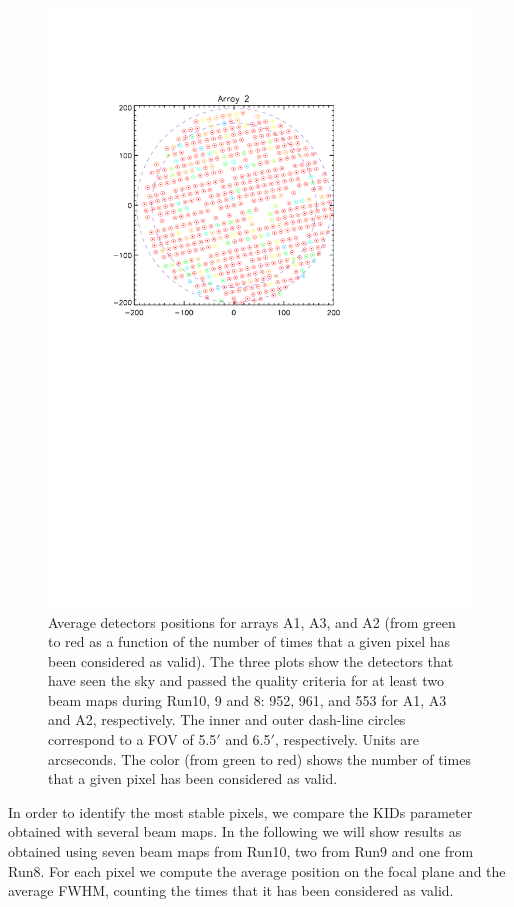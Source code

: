 \begin{figure}[htp]
\begin{center}
\includegraphics[trim=2cm 14cm 5cm 4cm, clip=true,width=0.6\linewidth]{Figures/A2_fwhm_color_count.pdf}
\caption{Average detectors positions for arrays A1, A3, and A2 (from
  green to red as a function of the number of times that a given pixel
  has been considered as valid). The three plots show the detectors
  that have seen the sky and passed the quality criteria for at least
  two beam maps during Run10, 9 and 8: 952, 961, and 553
  for A1, A3 and A2, respectively. The inner and outer dash-line circles correspond to a FOV of 5.5$\prime$ and 6.5$\prime$, respectively. Units are arcseconds. The color (from green to red)  shows the number of times that a given pixel has been considered as valid.}
\label{fig:avg_fov_color}
\end{center}
\end{figure}

In order to identify the most stable pixels, we compare the KIDs parameter obtained with several beam maps. 
In the following we will show results as obtained using seven beam maps from Run10, two from Run9 and one from Run8.
For each pixel we compute the average position on the focal plane and the average FWHM, counting the times that it has been considered as valid.


